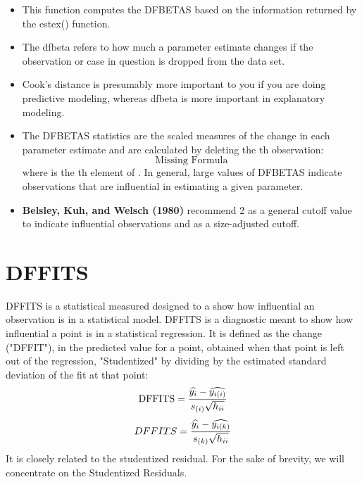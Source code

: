 \documentclass[12pt, a4paper]{report}
\theoremstyle{plain}
\theoremstyle{definition}
\theoremstyle{remark}
\begin{document}
\begin{itemize}
\item This function computes the DFBETAS based on the information returned by the estex() function.
\item The dfbeta refers to how much a parameter estimate changes if the observation or case in question is dropped from the data set.  
\item Cook's distance is presumably more important to you if you are doing predictive modeling, whereas dfbeta is more important in explanatory modeling.

\item The DFBETAS statistics are the scaled measures of the change in each parameter estimate and are calculated by deleting the th observation:
\[ \mbox{Missing Formula}\]
where  is the th element of .
In general, large values of DFBETAS indicate observations that are influential in estimating a given parameter. \item \textbf{Belsley, Kuh, and Welsch (1980)} recommend 2 as a general cutoff value to indicate influential observations and  as a size-adjusted cutoff.
\end{itemize}




\section{DFFITS} %
DFFITS is a statistical measured designed to a show how influential an observation is in a statistical model. DFFITS is a diagnostic meant to show how influential a point is in a statistical regression. It is defined as the change ("DFFIT"), in the predicted value for a point, obtained when that point is left out of the regression, "Studentized" by dividing by the estimated standard deviation of the fit at that point:
\[ \mbox{DFFITS} = {\widehat{y_i} - \widehat{y_{i(i)}} \over s_{(i)} \sqrt{h_{ii}}}\]
\begin{displaymath} DFFITS = {\widehat{y_i} -
	\widehat{y_{i(k)}} \over s_{(k)} \sqrt{h_{ii}}} \end{displaymath}
It is closely related to the studentized residual. For the sake of brevity, we will concentrate on the Studentized Residuals.


\end{document}
